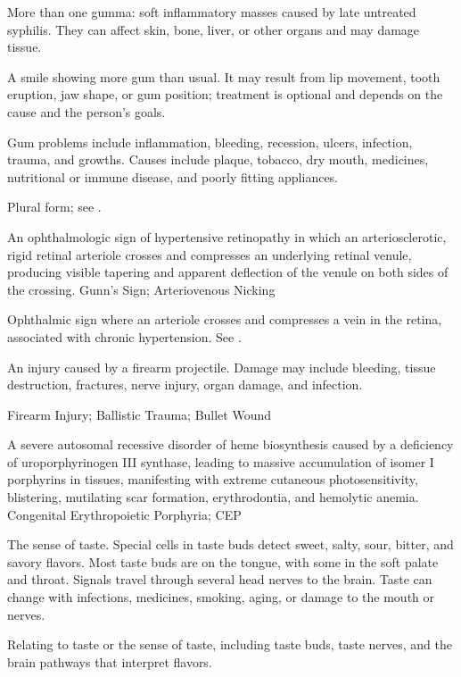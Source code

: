  More than one gumma: soft inflammatory masses caused by late untreated syphilis. They can affect skin, bone, liver, or other organs and may damage tissue.

 A smile showing more gum than usual. It may result from lip movement, tooth eruption, jaw shape, or gum position; treatment is optional and depends on the cause and the person’s goals.

 Gum problems include inflammation, bleeding, recession, ulcers, infection, trauma, and growths. Causes include plaque, tobacco, dry mouth, medicines, nutritional or immune disease, and poorly fitting appliances.

 Plural form; see .

 An ophthalmologic sign of hypertensive retinopathy in which an arteriosclerotic, rigid retinal arteriole crosses and compresses an underlying retinal venule, producing visible tapering and apparent deflection of the venule on both sides of the crossing.
\synonyms
Gunn's Sign; Arteriovenous Nicking

 Ophthalmic sign where an arteriole crosses and compresses a vein in the retina, associated with chronic hypertension. See .

 An injury caused by a firearm projectile. Damage may include bleeding, tissue destruction, fractures, nerve injury, organ damage, and infection.

\synonyms
Firearm Injury; Ballistic Trauma; Bullet Wound

 A severe autosomal recessive disorder of heme biosynthesis caused by a deficiency of uroporphyrinogen III synthase, leading to massive accumulation of isomer I porphyrins in tissues, manifesting with extreme cutaneous photosensitivity, blistering, mutilating scar formation, erythrodontia, and hemolytic anemia.
\synonyms
Congenital Erythropoietic Porphyria; CEP

 The sense of taste. Special cells in taste buds detect sweet, salty, sour, bitter, and savory flavors. Most taste buds are on the tongue, with some in the soft palate and throat. Signals travel through several head nerves to the brain. Taste can change with infections, medicines, smoking, aging, or damage to the mouth or nerves.

 Relating to taste or the sense of taste, including taste buds, taste nerves, and the brain pathways that interpret flavors.


